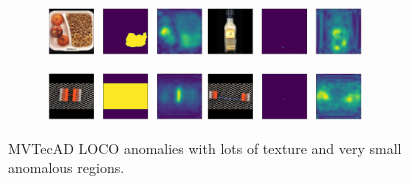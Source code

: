 \begin{figure}[htbp]
    \centering
    \begin{subfigure}[b]{\textwidth}
        \includegraphics[width=0.45\textwidth]{figures/difficultAnomalies/breakfast_box_test_logical_anomalies_011.png}
        \hfill
        \includegraphics[width=0.45\textwidth]{figures/difficultAnomalies/juice_bottle_test_structural_anomalies_059.png}

    \end{subfigure}
    \begin{subfigure}[b]{\textwidth}
        \includegraphics[width=0.45\textwidth]{figures/difficultAnomalies/splicing_connectors_test_logical_anomalies_064.png}
        \hfill
        \includegraphics[width=0.45\textwidth]{figures/difficultAnomalies/splicing_connectors_test_structural_anomalies_001.png}

    \end{subfigure}
    \caption{MVTecAD LOCO \cite{LOCODentsAndScratchesBergmann2022} anomalies with lots of texture and very small anomalous regions.}
    \label{fig:difficultAnomalies}
\end{figure}